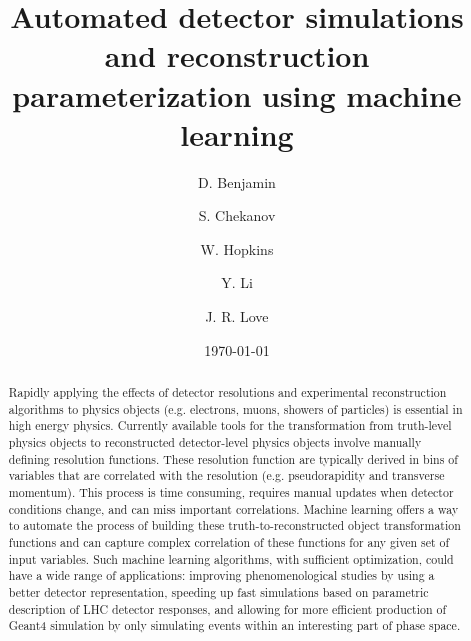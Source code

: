 \documentclass[showpacs,showkeys,preprint,prd,nofootinbib,linenumbers,12pt,superscriptaddress]{revtex4-1}
\begin{document}


\date{\today}

\vspace{2.5cm}

\title{
  Automated detector simulations and reconstruction parameterization using machine learning 
}

\author{D. Benjamin}
\author{S. Chekanov}
\author{W. Hopkins}
\author{Y. Li}
\author{J. R. Love}

\begin{abstract}
Rapidly applying the effects of detector resolutions and experimental reconstruction algorithms to physics objects (e.g. electrons, muons, showers of particles) is essential in high energy physics. Currently available tools for the transformation from truth-level physics objects to reconstructed detector-level physics objects involve manually defining resolution functions. These resolution function are typically derived in bins of variables that are correlated with the resolution (e.g. pseudorapidity and transverse momentum). This process is time consuming, requires manual updates when detector conditions change, and can miss important correlations. Machine learning offers a way to automate the process of building these truth-to-reconstructed object transformation functions and can capture complex correlation of these functions for any given set of input variables. Such machine learning algorithms, with sufficient optimization, could have a wide range of applications: improving phenomenological studies by using a better detector representation, speeding up fast simulations based on parametric description of LHC detector responses, and allowing for more efficient production of Geant4 simulation by only simulating events within an interesting part of phase space.
\end{abstract}
\end{document}
